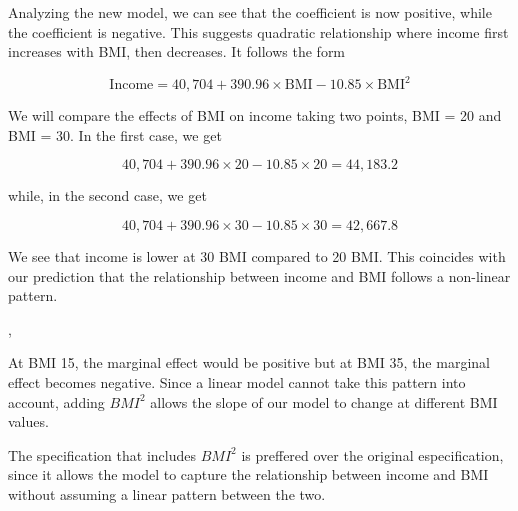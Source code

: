 Analyzing the new model, we can see that the  coefficient is now positive, while the  coefficient is negative. This suggests quadratic relationship where income first increases with BMI, then decreases. It follows the form

\begin{equation}
    \text{Income} = 40,704 + 390.96 \times \text{BMI} - 10.85 \times \text{BMI}^2
\end{equation}

We will compare the effects of BMI on income taking two points, BMI = 20 and BMI = 30. In the first case, we get 

\vspace{-1em}

\begin{equation}
    40,704 + 390.96 \times 20 - 10.85 \times 20 = 44,183.2
\end{equation}

while, in the second case, we get

\vspace{-1em}

\begin{equation}
    40,704 + 390.96 \times 30 - 10.85 \times 30 = 42,667.8
\end{equation}

We see that income is lower at 30 BMI compared to 20 BMI. This coincides with our prediction that the relationship between income and BMI follows a non-linear pattern.

,

At BMI 15, the marginal effect would be positive but at BMI 35, the marginal effect becomes negative. Since a linear model cannot take this pattern into account, adding $BMI^2$ allows the slope of our model to change at different BMI values.


The specification that includes $BMI^2$ is preffered over the original especification, since it allows the model to capture the relationship between income and BMI without assuming a linear pattern between the two.
